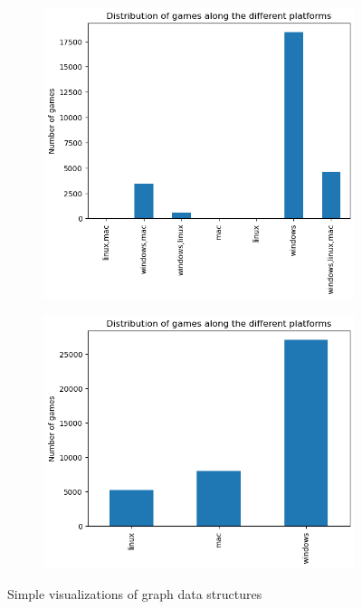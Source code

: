 \documentclass[11pt]{article}
\begin{document}
\begin{figure}[h]
    \centering
    \begin{subfigure}[b]{0.45\columnwidth}
        \centering
        \includegraphics[width=\textwidth]{graphics/insight3_graph1.png}
        \subcaption{}
        \label{fig:insight3_1}
    \end{subfigure}
    \begin{subfigure}[b]{0.45\columnwidth}
        \centering
        \includegraphics[width=\textwidth]{graphics/insight3_graph2.png}
        \subcaption{}
        \label{fig:insight3_2}
    \end{subfigure}
    
    \caption{Simple visualizations of graph data structures}
    \label{fig:insight3_distro_plat} 
  \end{figure}
\end{document}
